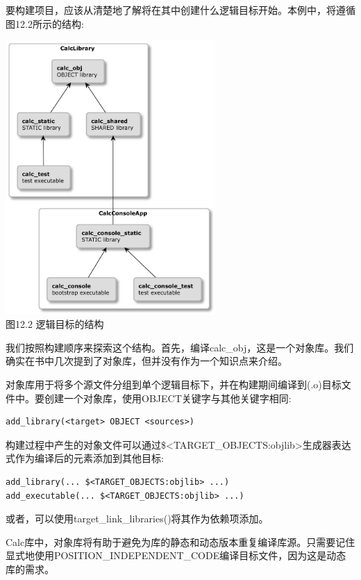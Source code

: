 
要构建项目，应该从清楚地了解将在其中创建什么逻辑目标开始。本例中，将遵循图12.2所示的结构:

\begin{center}
\includegraphics[width=0.6\textwidth]{content/3/chapter12/images/2.jpg}\\
图12.2 逻辑目标的结构
\end{center}

我们按照构建顺序来探索这个结构。首先，编译calc\_obj，这是一个对象库。我们确实在书中几次提到了对象库，但并没有作为一个知识点来介绍。


对象库用于将多个源文件分组到单个逻辑目标下，并在构建期间编译到(.o)目标文件中。要创建一个对象库，使用OBJECT关键字与其他关键字相同:

\begin{lstlisting}[style=styleCMake]
add_library(<target> OBJECT <sources>)
\end{lstlisting}

构建过程中产生的对象文件可以通过\$<TARGET\_OBJECTS:objlib>生成器表达式作为编译后的元素添加到其他目标:

\begin{lstlisting}[style=styleCMake]
add_library(... $<TARGET_OBJECTS:objlib> ...)
add_executable(... $<TARGET_OBJECTS:objlib> ...)
\end{lstlisting}

或者，可以使用target\_link\_libraries()将其作为依赖项添加。

Calc库中，对象库将有助于避免为库的静态和动态版本重复编译库源。只需要记住显式地使用POSITION\_INDEPENDENT\_CODE编译目标文件，因为这是动态库的需求。


